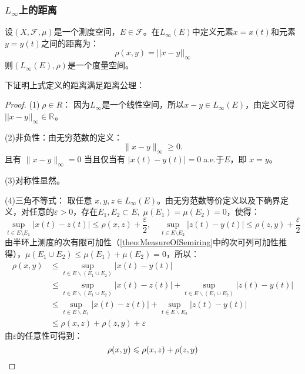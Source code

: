 \subsubsection{$L_{\infty}$上的距离}
\begin{definition}
	设$(X,\mathscr{F},\mu)$是一个测度空间，$E\in\mathscr{F}$。在$L_{\infty}(E)$中定义元素$x=x(t)$和元素$y=y(t)$之间的距离为：
	\begin{equation*}
		\rho(x,y)=||x-y||_\infty
	\end{equation*}
	则$(L_{\infty}(E),\rho)$是一个度量空间。
\end{definition}
下证明上式定义的距离满足距离公理：
\begin{proof}
	(1)$\;\rho\in R$： 因为$L_{\infty}$是一个线性空间，所以$x-y\in L_{\infty}(E)$，由定义可得$||x-y||_{\infty}\in\mathbb{R}^{}$。\par
	(2)非负性：由无穷范数的定义：
	\begin{equation*}
		\|x-y\|_\infty \geqslant 0.
	\end{equation*}
	且有 \(\|x-y\|_\infty=0\) 当且仅当有 \(|x(t)-y(t)|=0\;\)a.e.于$E$，即 \(x=y\)。\par
	(3)对称性显然。\par
	(4)三角不等式：
	取任意 \(x,y,z\in L_{\infty}(E)\)。由无穷范数等价定义以及下确界定义，对任意的$\varepsilon>0$，存在$E_1,E_2\subset E,\;\mu(E_1)=\mu(E_2)=0$，使得：
	\begin{equation*}
		\sup_{t\in E\setminus E_1}|x(t)-z(t)|\leqslant \rho(x,z)+\frac{\varepsilon}{2},
		\quad
		\sup_{t\in E\setminus E_2}|z(t)-y(t)|\leqslant \rho(z,y)+\frac{\varepsilon}{2}
	\end{equation*}
	由半环上测度的次有限可加性（\cref{theo:MeasureOfSemiring}中的次可列可加性推得），$\mu(E_1\cup E_2)\leqslant\mu(E_1)+\mu(E_2)=0$，所以：
	\begin{align*}
		\rho(x,y)
		&\leqslant\sup_{t\in E\backslash(E_1\cup E_2)}|x(t)-y(t)| \\
		&\leqslant\sup_{t\in E\backslash(E_1\cup E_2)}|x(t)-z(t)|+\sup_{t\in E\backslash(E_1\cup E_2)}|z(t)-y(t)| \\
		&\leqslant\sup_{t\in E\backslash E_1}|x(t)-z(t)|+\sup_{t\in E\backslash E_2}|z(t)-y(t)| \\
		&\leqslant\rho(x,z)+\rho(z,y)+\varepsilon
	\end{align*}
	由$\varepsilon$的任意性可得到：
	\begin{equation*}
		\rho(x,y)\leqslant\rho(x,z)+\rho(z,y)\qedhere
	\end{equation*}
\end{proof}
